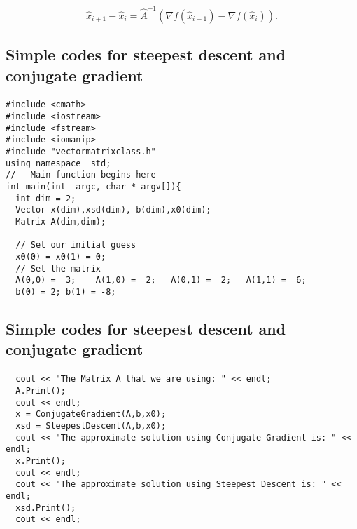 \documentclass[%
twoside,                 %
final,                   %
10pt]{article}
\begin{document}
\begin{equation*}
\hat{x}_{i+1}-\hat{x}_i=\hat{A}^{-1}(\nabla f(\hat{x}_{i+1})-\nabla f(\hat{x}_i)).
\end{equation*}



\subsection*{Simple codes for  steepest descent and conjugate gradient}

\paragraph{}
\begin{verbatim}
#include <cmath>
#include <iostream>
#include <fstream>
#include <iomanip>
#include "vectormatrixclass.h"
using namespace  std;
//   Main function begins here
int main(int  argc, char * argv[]){
  int dim = 2;
  Vector x(dim),xsd(dim), b(dim),x0(dim);
  Matrix A(dim,dim);
  
  // Set our initial guess
  x0(0) = x0(1) = 0;
  // Set the matrix  
  A(0,0) =  3;    A(1,0) =  2;   A(0,1) =  2;   A(1,1) =  6; 
  b(0) = 2; b(1) = -8;
\end{verbatim}




\subsection*{Simple codes for  steepest descent and conjugate gradient}

\paragraph{}
\begin{verbatim}
  cout << "The Matrix A that we are using: " << endl;
  A.Print();
  cout << endl;
  x = ConjugateGradient(A,b,x0);
  xsd = SteepestDescent(A,b,x0);
  cout << "The approximate solution using Conjugate Gradient is: " << endl;
  x.Print();
  cout << endl;
  cout << "The approximate solution using Steepest Descent is: " << endl;
  xsd.Print();
  cout << endl;
\end{verbatim}
\end{document}
